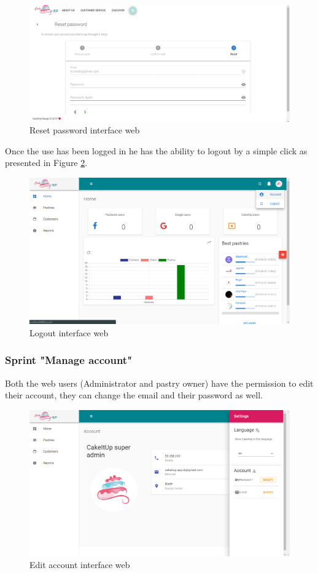 \documentclass[12pt,a4paper]{report}
\begin{document}
\begin{figure}[H]
	\centering
	\includegraphics[width=6.5in,keepaspectratio]{reset-password.png}
	\caption{Reset password interface web}
	\label{resetpassword-interface}
\end{figure}
\clearpage
Once the use has been logged in he has the ability to logout by a simple click as presented in Figure \ref{logout-interface}.
\begin{figure}[H]
	\centering
	\includegraphics[width=5.5in,keepaspectratio]{logout.png}
	\caption{Logout interface web}
	\label{logout-interface}
\end{figure}
\subsubsection*{Sprint "Manage account"}
Both the web users (Administrator and pastry owner) have the permission to edit their account, they can change the email and their password as well.
\begin{figure}[H]
	\centering
	\includegraphics[width=6in,keepaspectratio]{manageaccountAdmin.png}
	\caption{Edit account interface web}
	\label{editaccountadmin-interface}
\end{figure} 
\end{document}
